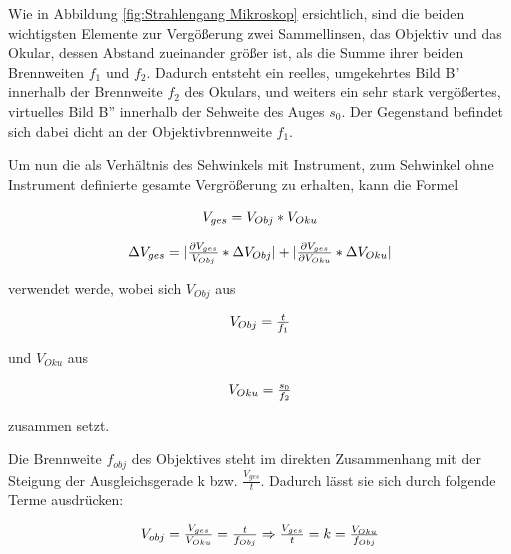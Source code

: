 \documentclass[12pt,a4paper,twoside]{article}
\begin{document}
\noindent
Wie in Abbildung \ref{fig:Strahlengang Mikroskop} ersichtlich, sind die beiden wichtigsten Elemente zur Vergößerung zwei Sammellinsen, das Objektiv und das Okular, dessen Abstand zueinander größer ist, als die Summe ihrer beiden Brennweiten $f_{1}$ und $f_{2}$. 
Dadurch entsteht ein reelles, umgekehrtes Bild B' innerhalb der Brennweite $f_{2}$ des Okulars, und weiters ein sehr stark vergößertes, virtuelles Bild B'' innerhalb der Sehweite des Auges $s_{0}$. Der Gegenstand befindet sich dabei dicht an der Objektivbrennweite $f_{1}$. \newline

\noindent
Um nun die als Verhältnis des Sehwinkels mit Instrument, zum Sehwinkel ohne Instrument definierte gesamte Vergrößerung zu erhalten, kann die Formel

    \begin{equation}
        \label{eq:Gesamtvergrößerung}
        \centerline{$V_{ges}=V_{Obj}*V_{Oku}$}
    \end{equation}

    \begin{equation}
        \label{eq:Unsicherheit_Gesamtvergrößerung}
        \centerline{$\Delta V_{ges} = \vert \frac{\partial V_{ges}}{V_{Obj}} * \Delta V_{Obj} \vert + \vert \frac{\partial V_{ges}}{\partial V_{Oku}} * \Delta V_{Oku} \vert$}
    \end{equation}

\noindent
verwendet werde, wobei sich $V_{Obj}$ aus

\begin{equation}
    \label{eq:Objektivvergrößerung}
    \centerline{$V_{Obj}=\frac{t}{f_{1}}$}
\end{equation}

\noindent
und $V_{Oku}$ aus

\begin{equation}
    \label{eq:Okularvergrößerung}
    \centerline{$V_{Oku}=\frac{s_{0}}{f_{2}}$}
\end{equation}

\noindent
zusammen setzt. \newline

\noindent
Die Brennweite $f_{obj}$ des Objektives steht im direkten Zusammenhang mit der Steigung der Ausgleichsgerade k bzw. $\frac{V_{ges}}{t}$. Dadurch lässt sie sich durch folgende Terme ausdrücken:

\begin{equation}
    \label{eq:Objektivbrennweite}
    \centerline{$V_{obj}=\frac{V_{ges}}{V_{Oku}}=\frac{t}{f_{Obj}} \Rightarrow \frac{V_{ges}}{t} = k = \frac{V_{Oku}}{f_{Obj}}$}
\end{equation}
\end{document}
